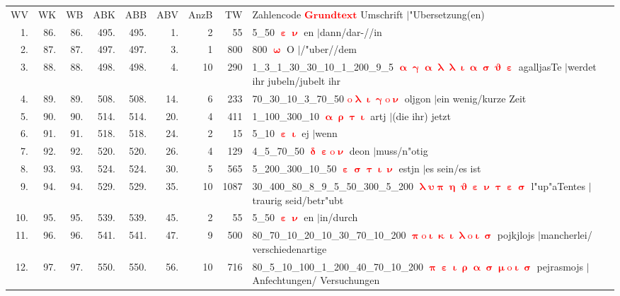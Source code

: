 \documentclass[a4paper,10pt,landscape]{article}
\begin{document}
\begin{tabular}{rrrrrrrrp{120mm}}
WV&WK&WB&ABK&ABB&ABV&AnzB&TW&Zahlencode \textcolor{red}{$\boldsymbol{Grundtext}$} Umschrift $|$"Ubersetzung(en)\\
1.&86.&86.&495.&495.&1.&2&55&5\_50 \textcolor{red}{$\boldsymbol{\upepsilon\upnu}$} en $|$dann/dar-//in\\
2.&87.&87.&497.&497.&3.&1&800&800 \textcolor{red}{$\boldsymbol{\upomega}$} O $|$/"uber//dem\\
3.&88.&88.&498.&498.&4.&10&290&1\_3\_1\_30\_30\_10\_1\_200\_9\_5 \textcolor{red}{$\boldsymbol{\upalpha\upgamma\upalpha\uplambda\uplambda\upiota\upalpha\upsigma\upvartheta\upepsilon}$} agalljasTe $|$werdet ihr jubeln/jubelt ihr\\
4.&89.&89.&508.&508.&14.&6&233&70\_30\_10\_3\_70\_50 \textcolor{red}{$\boldsymbol{\mathrm{o}\uplambda\upiota\upgamma\mathrm{o}\upnu}$} oljgon $|$ein wenig/kurze Zeit\\
5.&90.&90.&514.&514.&20.&4&411&1\_100\_300\_10 \textcolor{red}{$\boldsymbol{\upalpha\uprho\uptau\upiota}$} artj $|$(die ihr) jetzt\\
6.&91.&91.&518.&518.&24.&2&15&5\_10 \textcolor{red}{$\boldsymbol{\upepsilon\upiota}$} ej $|$wenn\\
7.&92.&92.&520.&520.&26.&4&129&4\_5\_70\_50 \textcolor{red}{$\boldsymbol{\updelta\upepsilon\mathrm{o}\upnu}$} deon $|$muss/n"otig\\
8.&93.&93.&524.&524.&30.&5&565&5\_200\_300\_10\_50 \textcolor{red}{$\boldsymbol{\upepsilon\upsigma\uptau\upiota\upnu}$} estjn $|$es sein/es ist\\
9.&94.&94.&529.&529.&35.&10&1087&30\_400\_80\_8\_9\_5\_50\_300\_5\_200 \textcolor{red}{$\boldsymbol{\uplambda\upsilon\uppi\upeta\upvartheta\upepsilon\upnu\uptau\upepsilon\upsigma}$} l"up"aTentes $|$traurig seid/betr"ubt\\
10.&95.&95.&539.&539.&45.&2&55&5\_50 \textcolor{red}{$\boldsymbol{\upepsilon\upnu}$} en $|$in/durch\\
11.&96.&96.&541.&541.&47.&9&500&80\_70\_10\_20\_10\_30\_70\_10\_200 \textcolor{red}{$\boldsymbol{\uppi\mathrm{o}\upiota\upkappa\upiota\uplambda\mathrm{o}\upiota\upsigma}$} pojkjlojs $|$mancherlei/ verschiedenartige\\
12.&97.&97.&550.&550.&56.&10&716&80\_5\_10\_100\_1\_200\_40\_70\_10\_200 \textcolor{red}{$\boldsymbol{\uppi\upepsilon\upiota\uprho\upalpha\upsigma\upmu\mathrm{o}\upiota\upsigma}$} pejrasmojs $|$Anfechtungen/ Versuchungen\\
\end{tabular}\medskip \\
\end{document}
